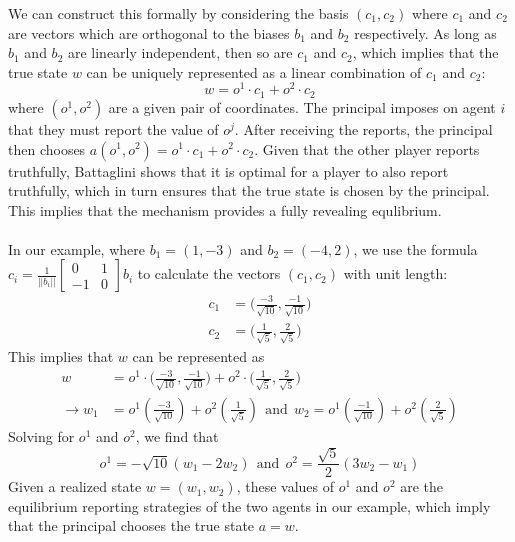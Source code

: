 \documentclass[a4paper]{article}
\begin{document}
	We can construct this formally by considering the basis $(c_1,c_2)$ where $c_1$ and $c_2$ are vectors which are orthogonal to the biases $b_1$ and $b_2$ respectively. As long as $b_1$ and $b_2$ are linearly independent, then so are $c_1$ and $c_2$, which implies that the true state $w$ can be uniquely represented as a linear combination of $c_1$ and $c_2$:
	\begin{equation}
		w=o^1 \cdot c_1 + o^2 \cdot c_2 \nonumber
	\end{equation}
	where $(o^1,o^2)$ are a given pair of coordinates. The principal imposes on agent $i$ that they must report the value of $o^j$. After receiving the reports, the principal then chooses $a(o^1,o^2)=o^1 \cdot c_1 + o^2 \cdot c_2$. Given that the other player reports truthfully, Battaglini shows that it is optimal for a player to also report truthfully, which in turn ensures that the true state is chosen by the principal. This implies that the mechanism provides a fully revealing equlibrium.\\\\
	In our example, where $b_1=(1,-3)$ and $b_2=(-4,2)$, we use the formula $c_i=\frac{1}{||b_i||}
	\begin{bmatrix}
		0 & 1\\
		-1 & 0
	\end{bmatrix}b_i$ to calculate the vectors $(c_1,c_2)$ with unit length:
	\begin{align}
		c_1&=\bigg(\frac{-3}{\sqrt{10}},\frac{-1}{\sqrt{10}}\bigg) \nonumber\\
		c_2&=\bigg(\frac{1}{\sqrt{5}},\frac{2}{\sqrt{5}}\bigg) \nonumber
	\end{align}
	This implies that $w$ can be represented as 
	\begin{align}
		w&=o^1 \cdot \bigg(\frac{-3}{\sqrt{10}},\frac{-1}{\sqrt{10}}\bigg) + o^2 \cdot \bigg(\frac{1}{\sqrt{5}},\frac{2}{\sqrt{5}}\bigg)\nonumber\\
		\rightarrow w_1&=o^1(\frac{-3}{\sqrt{10}})+o^2(\frac{1}{\sqrt{5}})\ \ \text{and}\ \ \nonumber
		w_2=o^1(\frac{-1}{\sqrt{10}})+o^2(\frac{2}{\sqrt{5}}) \nonumber
	\end{align}
	Solving for $o^1$ and $o^2$, we find that
	\begin{equation}
		o^1=-\sqrt{10}(w_1-2w_2) \ \ \text{and} \ \ o^2=\frac{\sqrt{5}}{2}(3w_2-w_1)\nonumber
	\end{equation}
	Given a realized state $w=(w_1,w_2)$, these values of $o^1$ and $o^2$ are the equilibrium reporting strategies of the two agents in our example, which imply that the principal chooses the true state $a=w$.

\fi
\end{document}
